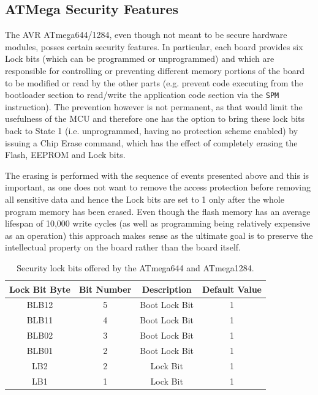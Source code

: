 \documentclass[10pt,a4paper,twocolumn]{article}
\begin{document}
	\subsection{ATMega Security Features}
	
	The AVR ATmega644/1284, even though not meant to be secure hardware modules, posses certain security features. In particular, each board provides six Lock bits (which can be programmed or unprogrammed) and which are responsible for controlling or preventing different memory portions of the board to be modified or read by the other parts (e.g. prevent code executing from the bootloader section to read/write the application code section via the \texttt{SPM} instruction). The prevention however is not permanent, as that would limit the usefulness of the MCU and therefore one has the option to bring these lock bits back to State 1 (i.e. unprogrammed, having no protection scheme enabled) by issuing a Chip Erase command, which has the effect of completely erasing the Flash, EEPROM and Lock bits.
	
	The erasing is performed with the sequence of events presented above and this is important, as one does not want to remove the access protection before removing all sensitive data and hence the Lock bits are set to 1 only after the whole program memory has been erased. Even though the flash memory has an average lifespan of 10,000 write cycles (as well as programming being relatively expensive as an operation) this approach makes sense as the ultimate goal is to preserve the intellectual property on the board rather than the board itself.
	
	\begin{table}
		\center
		\begin{tabular}{| c | c | c | c |}
			\hline
			\textbf{Lock Bit Byte} & \textbf{Bit Number} & \textbf{Description} & \textbf{Default Value}\\
			\hline \hline
			BLB12 & 5 & Boot Lock Bit & 1\\
			BLB11 & 4 & Boot Lock Bit & 1\\
			BLB02 & 3 & Boot Lock Bit & 1\\
			BLB01 & 2 & Boot Lock Bit & 1\\
			LB2 & 2 & Lock Bit & 1 \\
			LB1 & 1 & Lock Bit & 1 \\
			\hline
		\end{tabular}
		\caption{Security lock bits offered by the ATmega644 and ATmega1284.}
		\label{table:lock_bits}
	\end{table}
	
\end{document}
